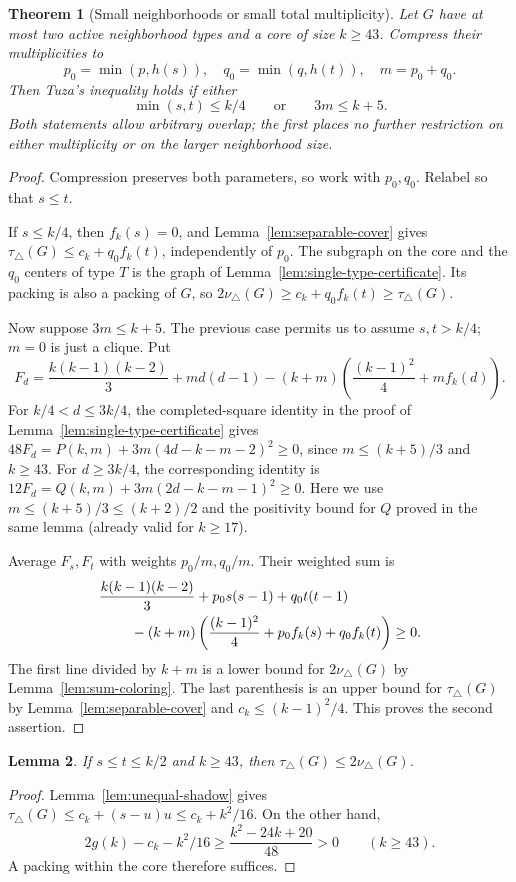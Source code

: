 \documentclass[11pt]{article}
\newtheorem{theorem}{Theorem}
\newtheorem{lemma}[theorem]{Lemma}
\newcommand{\tp}{\nu_{\triangle}}
\newcommand{\tc}{\tau_{\triangle}}
\begin{document}
\begin{theorem}[Small neighborhoods or small total multiplicity]\label{thm:direct-regimes}
Let $G$ have at most two active neighborhood types and a core of size
$k\geq43$. Compress their multiplicities to
\[
 p_0=\min(p,h(s)),\quad q_0=\min(q,h(t)),\quad m=p_0+q_0.
\]
Then Tuza's inequality holds if either
\[
 \boxed{\min(s,t)\leq k/4}
 \qquad\text{or}\qquad
 \boxed{3m\leq k+5.}
\]
Both statements allow arbitrary overlap; the first places no further
restriction on either multiplicity or on the larger neighborhood size.
\end{theorem}
\begin{proof}
Compression preserves both parameters, so work with $p_0,q_0$.
Relabel so that $s\leq t$.

If $s\leq k/4$, then $f_k(s)=0$, and
Lemma~\ref{lem:separable-cover} gives
$\tc(G)\leq c_k+q_0 f_k(t)$, independently of $p_0$.
The subgraph on the core and the $q_0$ centers of type $T$ is the graph
of Lemma~\ref{lem:single-type-certificate}. Its packing is also a
packing of $G$, so $2\tp(G)\geq c_k+q_0 f_k(t)\geq\tc(G)$.

Now suppose $3m\leq k+5$. The previous case permits us to assume
$s,t>k/4$; $m=0$ is just a clique. Put
\[
 F_d=\frac{k(k-1)(k-2)}3+m d(d-1)
 -(k+m)\left(\frac{(k-1)^2}{4}+m f_k(d)\right).
\]
For $k/4<d\leq3k/4$, the completed-square identity in the proof of
Lemma~\ref{lem:single-type-certificate} gives $48F_d=P(k,m)+3m(4d-k-m-2)^2\geq0$, since
$m\leq(k+5)/3$ and $k\geq43$.
For $d\geq3k/4$, the corresponding identity is
$12F_d=Q(k,m)+3m(2d-k-m-1)^2\geq0$.
Here we use $m\leq(k+5)/3\leq(k+2)/2$ and the positivity bound
for $Q$ proved in the same lemma (already valid for $k\geq17$).

Average $F_s,F_t$ with weights $p_0/m,q_0/m$. Their weighted sum is
\begin{align*}
 &\frac{k(k-1)(k-2)}3+p_0s(s-1)+q_0t(t-1)\\
 &\hspace{8mm}-(k+m)\left(\frac{(k-1)^2}{4}
                  +p_0 f_k(s)+q_0 f_k(t)\right)\geq0.
\end{align*}
The first line divided by $k+m$ is a lower bound for $2\tp(G)$
by Lemma~\ref{lem:sum-coloring}. The last parenthesis is an upper bound for
$\tc(G)$ by Lemma~\ref{lem:separable-cover} and
$c_k\leq(k-1)^2/4$. This proves the second assertion.
\end{proof}



\begin{lemma}\label{lem:half-large}
If $s\leq t\leq k/2$ and $k\geq43$, then $\tc(G)\leq2\tp(G)$.
\end{lemma}
\begin{proof}
Lemma~\ref{lem:unequal-shadow} gives
$\tc(G)\leq c_k+(s-u)u\leq c_k+k^2/16$. On the other hand,
\[
 2g(k)-c_k-k^2/16\geq\frac{k^2-24k+20}{48}>0
 \qquad(k\geq43).
\]
A packing within the core therefore suffices.
\end{proof}
\end{document}
